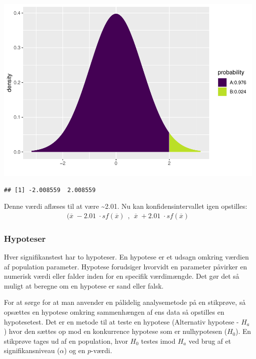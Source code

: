 \documentclass[
]{article}
\begin{document}
\includegraphics{TP2_files/figure-latex/unnamed-chunk-14-1.pdf}

\begin{verbatim}
## [1] -2.008559  2.008559
\end{verbatim}

Denne værdi aflæses til at være \textasciitilde2.01. Nu kan
konfidensintervallet igen opstilles: \[
\begin{aligned}
(\overline{x}\;-2.01 \;\cdot sf(\overline{x}) \ \ , \ \ \overline{x}\;+2.01 \;\cdot sf(\overline{x})
\end{aligned}
\]

\hypertarget{hypoteser}{%
\subsubsection{Hypoteser}\label{hypoteser}}

Hver signifikanstest har to hypoteser. En hypotese er et udsagn omkring
værdien af population parameter. Hypotese forudsiger hvorvidt en
parameter påvirker en numerisk værdi eller falder inden for en specifik
værdimængde. Det gør det så muligt at beregne om en hypotese er sand
eller falsk.

For at sørge for at man anvender en pålidelig analysemetode på en
stikprøve, så opsættes en hypotese omkring sammenhængen af ens data så
opstilles en hypotesetest. Det er en metode til at teste en hypotese
(Alternativ hypotese - \(H_a\)) hvor den sættes op mod en konkurrence
hypotese som er nulhypotesen (\(H_0\)). En stikprøve tages ud af en
population, hvor \(H_0\) testes imod \(H_a\) ved brug af et
signifikansniveau (\(\alpha\)) og en \(p\)-værdi.
\end{document}
